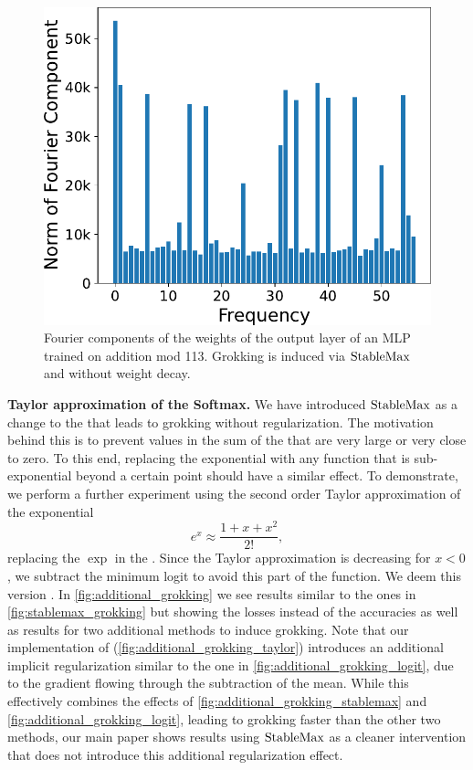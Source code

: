 \begin{figure}
\vspace{-0.5cm}
    \centering
    \includegraphics[width=\linewidth]{grokking_iclr_arxiv/figures/fourier.pdf}
    \vspace{-6mm}
    \caption{Fourier components of the weights of the output layer of an MLP trained on addition mod 113. Grokking is induced via $\mathrm{StableMax}$ and without weight decay.}
    \label{fig:fourier}
\end{figure}
\noindent\textbf{Taylor approximation of the Softmax.}
We have introduced $\mathrm{StableMax}$ as a change to the \softmax that leads to grokking without regularization. The motivation behind this is to prevent values in the sum of the \softmax that are very large or very close to zero. To this end, replacing the exponential with any function that is sub-exponential beyond a certain point should have a similar effect. To demonstrate, we perform a further experiment using the second order Taylor approximation of the exponential 
\begin{equation}
e^x\approx \frac{1 + x + x^2}{2!},    
\end{equation}
replacing the $\exp$ in the \softmax. Since the Taylor approximation is decreasing for $x<0$, we subtract the minimum logit to avoid this part of the function.  We deem this version \tsoftmax.
In \cref{fig:additional_grokking} we see results similar to the ones in \cref{fig:stablemax_grokking} but showing the losses instead of the accuracies as well as results for two additional methods to induce grokking. 
Note that our implementation of \tsoftmax (\cref{fig:additional_grokking_taylor}) introduces an additional implicit regularization similar to the one in  \cref{fig:additional_grokking_logit}, due to the gradient flowing through the subtraction of the mean. %
While this effectively combines the effects of \cref{fig:additional_grokking_stablemax} and \cref{fig:additional_grokking_logit}, leading to grokking faster than the other two methods, our main paper shows results using $\mathrm{StableMax}$ as a cleaner intervention that does not introduce this additional regularization effect. 

